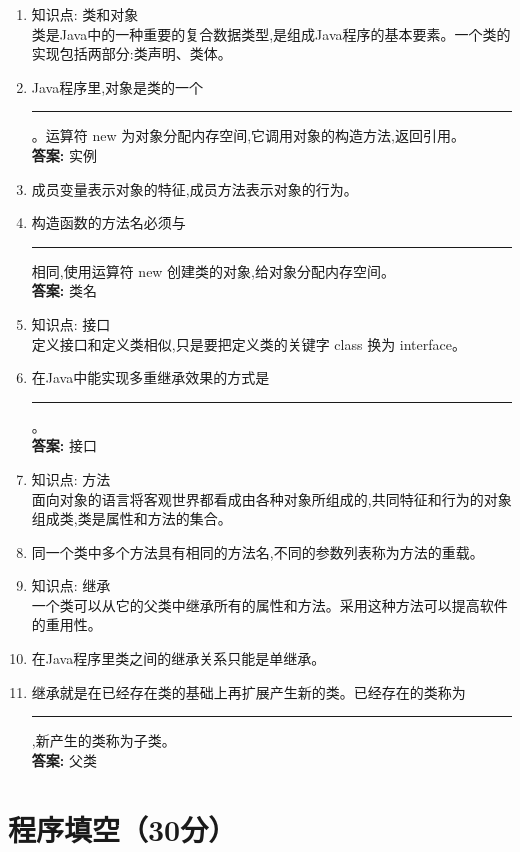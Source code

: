 \documentclass[a4paper,12pt]{article}
\newcommand{\blank}[1][1cm]{\rule{#1}{0.4pt}}
\begin{document}
\begin{enumerate}[leftmargin=*, label=\arabic*.]
	\item 知识点: 类和对象 \\
	      类是Java中的一种重要的复合数据类型,是组成Java程序的基本要素。一个类的实现包括两部分:类声明、类体。

	\item Java程序里,对象是类的一个\blank[2em]。运算符 new 为对象分配内存空间,它调用对象的构造方法,返回引用。 \\
	      \textbf{答案:} 实例

	\item 成员变量表示对象的特征,成员方法表示对象的行为。

	\item 构造函数的方法名必须与\blank[2em]相同,使用运算符 new 创建类的对象,给对象分配内存空间。 \\
	      \textbf{答案:} 类名

	\item 知识点: 接口 \\
	      定义接口和定义类相似,只是要把定义类的关键字 class 换为 interface。

	\item 在Java中能实现多重继承效果的方式是\blank[2em]。 \\
	      \textbf{答案:} 接口

	\item 知识点: 方法 \\
	      面向对象的语言将客观世界都看成由各种对象所组成的,共同特征和行为的对象组成类,类是属性和方法的集合。

	\item 同一个类中多个方法具有相同的方法名,不同的参数列表称为方法的重载。

	\item 知识点: 继承 \\
	      一个类可以从它的父类中继承所有的属性和方法。采用这种方法可以提高软件的重用性。

	\item 在Java程序里类之间的继承关系只能是单继承。

	\item 继承就是在已经存在类的基础上再扩展产生新的类。已经存在的类称为\blank[2em],新产生的类称为子类。 \\
	      \textbf{答案:} 父类
\end{enumerate}

\section{程序填空（30分）}
\end{document}
